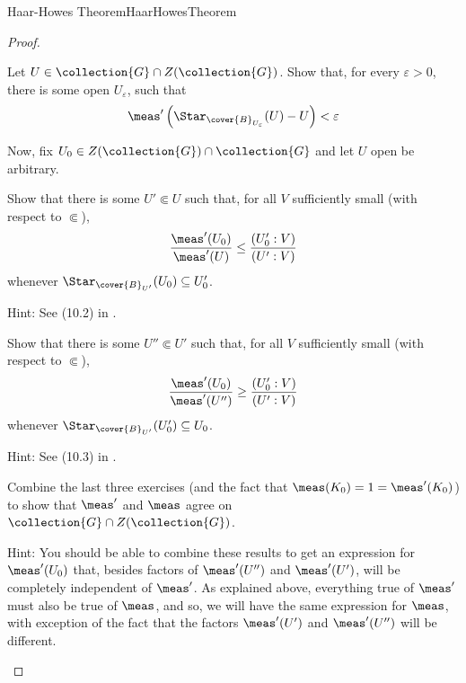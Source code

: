 \begin{thm}{Haar-Howes Theorem}{HaarHowesTheorem}
\begin{proof}
\begin{exr}[breakable=false]{}{}
Let $U\in \collection{G}\cap Z(\collection{G})$.  Show that, for every $\varepsilon >0$, there is some open $U_\varepsilon$, such that
\begin{equation}
\meas '\left( \Star _{\cover{B}_{U_{\varepsilon}}}(U)-U\right) <\varepsilon 
\end{equation}
\end{exr}
Now, fix $U_0\in Z(\collection{G})\cap \collection{G}$ and let $U$ open be arbitrary.
\begin{exr}[breakable=false]{}{}
Show that there is some $U'\Subset U$ such that, for all $V$ sufficiently small (with respect to $\Subset$),
\begin{equation}
\frac{\meas '(U_0)}{\meas '(U)}\leq \frac{(U_0':V)}{(U':V)}
\end{equation}
whenever $\Star _{\cover{B}_{U'}}(U_0)\subseteq U_0'$.
\begin{rmk}
Hint:  See (10.2) in \cite{Howes}.
\end{rmk}
\end{exr}
\begin{exr}[breakable=false]{}{}
Show that there is some $U''\Subset U'$ such that, for all $V$ sufficiently small (with respect to $\Subset$),
\begin{equation}
\frac{\meas '(U_0)}{\meas '(U'')}\geq \frac{(U_0':V)}{(U':V)}
\end{equation}
whenever $\Star _{\cover{B}_{U'}}(U_0')\subseteq U_0$.
\begin{rmk}
Hint:  See (10.3) in \cite{Howes}.
\end{rmk}
\end{exr}
\begin{exr}[breakable=false]{}{}
Combine the last three exercises (and the fact that $\meas (K_0)=1=\meas '(K_0)$) to show that $\meas '$ and $\meas$ agree on $\collection{G}\cap Z(\collection{G})$.
\begin{rmk}
Hint:  You should be able to combine these results to get an expression for $\meas '(U_0)$ that, besides factors of $\meas '(U'')$ and $\meas '(U')$, will be completely independent of $\meas '$.  As explained above, everything true of $\meas '$ must also be true of $\meas$, and so, we will have the same expression for $\meas$, with exception of the fact that the factors $\meas '(U')$ and $\meas '(U'')$ will be different.
\end{rmk}
\end{exr}
\end{proof}
\end{thm}

